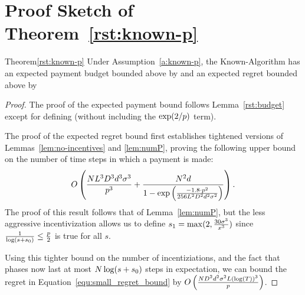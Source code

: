 \section{Proof Sketch of Theorem~\ref{rst:known-p}}
\label{sec:discussion-proof2}


\begin{rtheorem}{Theorem}{\ref{rst:known-p}}
Under Assumption~\ref{a:known-p}, the Known-\MinProb Algorithm has an expected payment budget bounded above by 
and an expected regret bounded above by
\end{rtheorem}

\begin{proof}
  The proof of the expected payment bound follows Lemma~\ref{rst:budget} except for defining
(without including the $\exp(2/p)$ term).

The proof of the expected regret bound first establishes tightened versions of Lemmas~\ref{lem:no-incentives} and \ref{lem:numP},
proving the following upper bound on the number of time steps in which a payment is made:
\begin{align}
O\left(\frac{N L^3 D^3 d^3 \sigma^3}{p^3}
  + \frac{N^2 d}{1 - \exp \left(
    \frac{-1.8 \cdot p^2}{256 L^2 D^2 d^2 \sigma^2}
  \right)} \right). \nonumber 
\end{align}
The proof of this result follows that of Lemma~\ref{lem:numP},
but the less aggressive incentivization allows us to define $s_1 = \max(2, \frac{30 \sigma^3}{x^3})$ since $\frac{1}{\log(s+s_0)} \leq \frac{p}{2}$ is true for all $s$.

Using this tighter bound on the number of incentiziations, and the fact that phases now last at most $N \log(s+s_0)$ steps in expectation, we can bound the regret in Equation~\ref{equ:small_regret_bound} by
$O\left(\frac{ND^2 d^2\sigma^2 L(\log(T))^3}{p}\right)$.
\end{proof}
